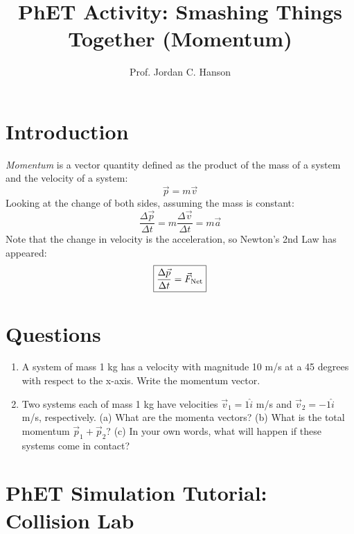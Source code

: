 \documentclass{article}
\begin{document}
\small

\title{PhET Activity: Smashing Things Together (Momentum)}
\author{Prof. Jordan C. Hanson}

\maketitle

\section{Introduction}

\textit{Momentum} is a vector quantity defined as the product of the mass of a system and the velocity of a system:
\begin{equation}
\vec{p} = m\vec{v}
\end{equation}
Looking at the change of both sides, assuming the mass is constant:
\begin{equation}
\frac{\Delta\vec{p}}{\Delta t} = m \frac{\Delta\vec{v}}{\Delta t} = m\vec{a}
\end{equation}
Note that the change in velocity is the acceleration, so Newton's 2nd Law has appeared:
\begin{equation}
\boxed{
\frac{\Delta\vec{p}}{\Delta t} = \vec{F}_{\rm Net}
}
\end{equation}

\section{Questions}

\begin{enumerate}
\item A system of mass 1 kg has a velocity with magnitude 10 m/s at a 45 degrees with respect to the x-axis.  Write the momentum vector. \\ \vspace{1cm}
\item Two systems each of mass 1 kg have velocities $\vec{v}_1 = 1\hat{i}$ m/s and $\vec{v}_2 = -1\hat{i}$ m/s, respectively. (a) What are the momenta vectors? (b) What is the total momentum $\vec{p}_1 + \vec{p}_2$? (c) In your own words, what will happen if these systems come in contact? \label{q:2} \\ \vspace{2cm}
\end{enumerate}

\section{PhET Simulation Tutorial: Collision Lab}
\end{document}
